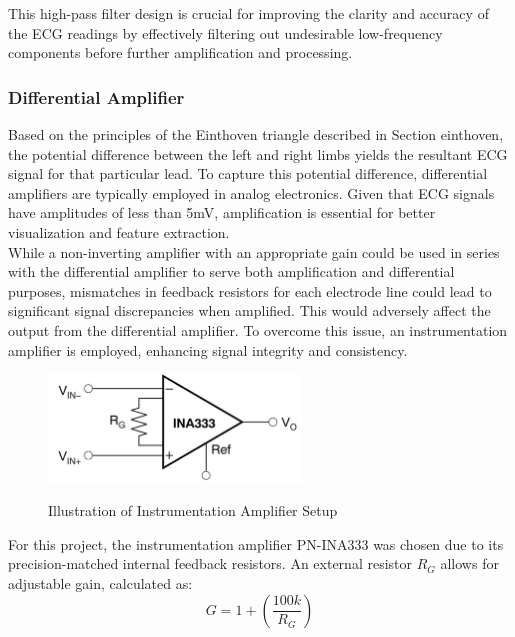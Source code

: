 \noindent This high-pass filter design is crucial for improving the clarity and accuracy of the ECG readings by effectively filtering out undesirable low-frequency components before further amplification and processing.\\

\subsubsection{Differential Amplifier}
\vspace{1em}
Based on the principles of the Einthoven triangle described in Section {einthoven}, the potential difference between the left and right limbs yields the resultant ECG signal for that particular lead. To capture this potential difference, differential amplifiers are typically employed in analog electronics. Given that ECG signals have amplitudes of less than 5mV, amplification is essential for better visualization and feature extraction. \\

\noindent While a non-inverting amplifier with an appropriate gain could be used in series with the differential amplifier to serve both amplification and differential purposes, mismatches in feedback resistors for each electrode line could lead to significant signal discrepancies when amplified. This would adversely affect the output from the differential amplifier. To overcome this issue, an instrumentation amplifier is employed, enhancing signal integrity and consistency.

\begin{figure}[h]
	\centering
	\includegraphics[width=0.6\textwidth]{images/Instrumentational amplfier}
	\caption{Illustration of Instrumentation Amplifier Setup}\cite{TI_INA333}
	\label{fig:instrumentation_amplifier}
\end{figure}

\noindent For this project, the instrumentation amplifier PN-INA333 \cite{TI_INA333} was chosen due to its precision-matched internal feedback resistors. An external resistor \( R_G \) allows for adjustable gain, calculated as:
\begin{equation}
G = 1 + \left(\frac{100k}{R_G}\right)
	\label{eq:gain equation}
\end{equation}

